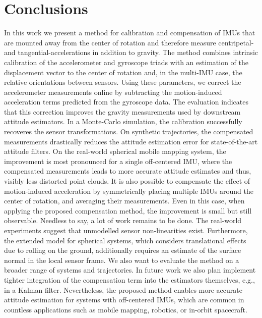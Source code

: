 \documentclass[journal]{IEEEtran}
\begin{document}
\section{Conclusions}
In this work we present a method for calibration and compensation of IMUs that are mounted away from the center of rotation and therefore measure centripetal- and tangential-accelerations in addition to gravity. 
The method combines intrinsic calibration of the accelerometer and gyroscope triads with an estimation of the displacement vector to the center of rotation and, in the multi-IMU case, the relative orientations between sensors. 
Using these parameters, we correct the accelerometer measurements online by subtracting the motion-induced acceleration terms predicted from the gyroscope data.
The evaluation indicates that this correction improves the gravity measurements used by downstream attitude estimators. 
In a Monte-Carlo simulation, the calibration successfully recoveres the sensor transformations. 
On synthetic trajectories, the compensated measurements drastically reduces the attitude estimation error for state-of-the-art attitude filters. 
On the real-world spherical mobile mapping system, the improvement is most pronounced for a single off-centered IMU, where the compensated measurements leads to more accurate attitude estimates and thus, visibly less distorted point clouds. 
It is also possible to compensate the effect of motion-induced acceleration by symmetrically placing multiple IMUs around the center of rotation, and averaging their measurements.
Even in this case, when applying the proposed compensation method, the improvement is small but still observable.
Needless to say, a lot of work remains to be done.
The real-world experiments suggest that unmodelled sensor non-linearities exist. 
Furthermore, the extended model for spherical systems, which considers translational effects due to rolling on the ground, additionally requires an estimate of the surface normal in the local sensor frame.
We also want to evaluate the method on a broader range of systems and trajectories.
In future work we also plan implement tighter integration of the compensation term into the estimators themselves, e.g., in a Kalman filter. 
Nevertheless, the proposed method enables more accurate attitude estimation for systems with off-centered IMUs, which are common in countless applications such as mobile mapping, robotics, or in-orbit spacecraft.




\end{document}
